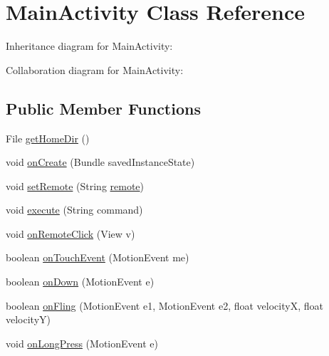 \hypertarget{classcom_1_1axcoto_1_1shinjuku_1_1sushi_1_1_main_activity}{\section{\-Main\-Activity \-Class \-Reference}
\label{classcom_1_1axcoto_1_1shinjuku_1_1sushi_1_1_main_activity}
}


\-Inheritance diagram for \-Main\-Activity\-:


\-Collaboration diagram for \-Main\-Activity\-:
\subsection*{\-Public \-Member \-Functions}
\begin{DoxyCompactItemize}
\item 
\-File \hyperlink{classcom_1_1axcoto_1_1shinjuku_1_1sushi_1_1_main_activity_ac6d370aea314986a5e2d7db2d3ab0df8}{get\-Home\-Dir} ()
\item 
void \hyperlink{classcom_1_1axcoto_1_1shinjuku_1_1sushi_1_1_main_activity_a85e87cb5ced88dff7c8173ecc4f636d1}{on\-Create} (\-Bundle saved\-Instance\-State)
\item 
void \hyperlink{classcom_1_1axcoto_1_1shinjuku_1_1sushi_1_1_main_activity_ad444cc07103ee19a277699ab5435e0c0}{set\-Remote} (\-String \hyperlink{classcom_1_1axcoto_1_1shinjuku_1_1sushi_1_1_main_activity_a183609665ec025bb030be97c68faa84f}{remote})
\item 
void \hyperlink{classcom_1_1axcoto_1_1shinjuku_1_1sushi_1_1_main_activity_a1d6ee937b4c42ba06093c71a06adac7b}{execute} (\-String command)
\item 
void \hyperlink{classcom_1_1axcoto_1_1shinjuku_1_1sushi_1_1_main_activity_a75706900f853cef9b80b37adfd59ef4e}{on\-Remote\-Click} (\-View v)
\item 
boolean \hyperlink{classcom_1_1axcoto_1_1shinjuku_1_1sushi_1_1_main_activity_a316e2162aee3b81438c6f324cadbfd4e}{on\-Touch\-Event} (\-Motion\-Event me)
\item 
boolean \hyperlink{classcom_1_1axcoto_1_1shinjuku_1_1sushi_1_1_main_activity_afe7febda1f2210be8658c06fce770e1c}{on\-Down} (\-Motion\-Event e)
\item 
boolean \hyperlink{classcom_1_1axcoto_1_1shinjuku_1_1sushi_1_1_main_activity_ae44fb084c2495a486a664f60ae319b8c}{on\-Fling} (\-Motion\-Event e1, \-Motion\-Event e2, float velocity\-X, float velocity\-Y)
\item 
void \hyperlink{classcom_1_1axcoto_1_1shinjuku_1_1sushi_1_1_main_activity_ac12f39cb7fd9003b2aa5ddf76f2e93fe}{on\-Long\-Press} (\-Motion\-Event e)

\end{DoxyCompactItemize}
